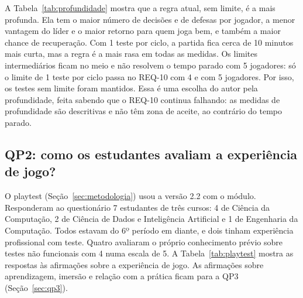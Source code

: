 A Tabela~\ref{tab:profundidade} mostra que a regra atual, sem limite, é a mais profunda. Ela tem o maior número
de decisões e de defesas por jogador, a menor vantagem do líder e o maior retorno para quem joga bem, e também a
maior chance de recuperação. Com 1 teste por ciclo, a partida fica cerca de 10 minutos mais curta, mas a regra é a
mais rasa em todas as medidas. Os limites intermediários ficam no meio e não resolvem o tempo parado com 5
jogadores: só o limite de 1 teste por ciclo passa no REQ-10 com 4 e com 5 jogadores. Por isso, os testes
sem limite foram mantidos. Essa é uma escolha do autor pela profundidade, feita sabendo que o REQ-10
continua falhando: as medidas de profundidade são descritivas e não têm zona de aceite, ao contrário do tempo
parado.

\subsection{QP2: como os estudantes avaliam a experiência de jogo?}
\label{sec:qp2}

O playtest (Seção~\ref{sec:metodologia}) usou a versão 2.2 com o módulo. Responderam ao questionário 7 estudantes
de três cursos: 4 de Ciência da Computação, 2 de Ciência de Dados e Inteligência Artificial e 1 de Engenharia da
Computação. Todos estavam do 6º período em diante, e dois tinham experiência profissional com teste. Quatro
avaliaram o próprio conhecimento prévio sobre testes não funcionais com 4 numa escala de 5. A
Tabela~\ref{tab:playtest} mostra as respostas às afirmações sobre a experiência de jogo. As afirmações sobre
aprendizagem, imersão e relação com a prática ficam para a QP3 (Seção~\ref{sec:qp3}).

